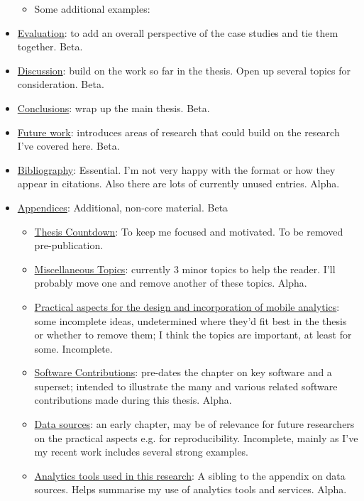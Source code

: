 \begin{itemize}
\begin{itemize}
        \item Some additional examples:
    \end{itemize}
    \item \href{chapter-evaluation}{Evaluation}: to add an overall perspective of the case studies and tie them together. Beta.
    \item \href{chapter-discussion}{Discussion}: build on the work so far in the thesis. Open up several topics for consideration. Beta.
    \item \href{chapter-conclusions}{Conclusions}: wrap up the main thesis. Beta.
    \item \href{chapter-future-work}{Future work}: introduces areas of research that could build on the research I've covered here. Beta.
    \item \href{the-bibliography-follows}{Bibliography}: Essential. I'm not very happy with the format or how they appear in citations. Also there are lots of currently unused entries. Alpha.
    \item \href{the-appendicies-follow}{Appendices}: Additional, non-core material. Beta
    \begin{itemize}
        \item \href{section-thesis-countdown}{Thesis Countdown}: To keep me focused and motivated. To be removed pre-publication.
        \item \href{appendix-miscellaneous-topics}{Miscellaneous Topics}: currently 3 minor topics to help the reader. I'll probably move one and remove another of these topics. Alpha.
        \item \href{appendix-practical-aspects}{Practical aspects for the design and incorporation of mobile analytics}: some incomplete ideas, undetermined where they'd fit best in the thesis or whether to remove them; I think the topics are important, at least for some. Incomplete.
        \item \href{appendix-software-contributions}{Software Contributions}: pre-dates the chapter on key software and a superset; intended to illustrate the many and various related software contributions made during this thesis. Alpha.
        \item \href{appendix-data-sources}{Data sources}: an early chapter, may be of relevance for future researchers on the practical aspects e.g. for reproducibility. Incomplete, mainly as I've my recent work includes several strong examples.
        \item \href{appendix-analytics-tools}{Analytics tools used in this research}: A sibling to the appendix on data sources. Helps summarise my use of analytics tools and services. Alpha.

\end{itemize}
\end{itemize}
